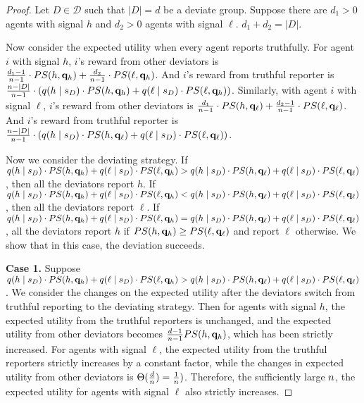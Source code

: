 \begin{proof}
    Let $D\in \mathcal{D}$ such that $|D| = d$ be a deviate group. Suppose there are $d_1 > 0$ agents with signal $h$ and $d_2 > 0$ agents with signal $\ell$. $d_1 + d_2 = |D|$. 

    Now consider the expected utility when every agent reports truthfully. For agent $i$ with signal $h$, $i$'s reward from other deviators is $\frac{d_1 -1}{n -1}\cdot PS(h, \mathbf{q}_h) + \frac{d_2}{n - 1}\cdot PS(\ell, \mathbf{q}_h)$. And $i$'s reward from truthful reporter is $\frac{n - |D|}{n - 1} \cdot (q(h\mid s_D)\cdot PS(h, \mathbf{q}_h) + q(\ell \mid s_D)\cdot PS(\ell, \mathbf{q}_h))$. Similarly, with agent $i$ with signal $\ell$, $i$'s reward from other deviators is $\frac{d_1}{n -1}\cdot PS(h, \mathbf{q}_\ell) + \frac{d_2 - 1}{n - 1}\cdot PS(\ell, \mathbf{q}_\ell)$. And $i$'s reward from truthful reporter is $\frac{n - |D|}{n - 1} \cdot (q(h\mid s_D)\cdot PS(h, \mathbf{q}_\ell) + q(\ell \mid s_D)\cdot PS(\ell, \mathbf{q}_\ell))$.

    Now we consider the deviating strategy. If $q(h\mid s_D)\cdot PS(h, \mathbf{q}_h) + q(\ell \mid s_D)\cdot PS(\ell, \mathbf{q}_h) > q(h\mid s_D)\cdot PS(h, \mathbf{q}_\ell) + q(\ell \mid s_D)\cdot PS(\ell, \mathbf{q}_\ell)$, then all the deviators report $h$. If $q(h\mid s_D)\cdot PS(h, \mathbf{q}_h) + q(\ell \mid s_D)\cdot PS(\ell, \mathbf{q}_h) < q(h\mid s_D)\cdot PS(h, \mathbf{q}_\ell) + q(\ell \mid s_D)\cdot PS(\ell, \mathbf{q}_\ell)$, then all the deviators report $\ell$. If $q(h\mid s_D)\cdot PS(h, \mathbf{q}_h) + q(\ell \mid s_D)\cdot PS(\ell, \mathbf{q}_h) = q(h\mid s_D)\cdot PS(h, \mathbf{q}_\ell) + q(\ell \mid s_D)\cdot PS(\ell, \mathbf{q}_\ell)$, all the deviators report $h$ if $PS(h, \mathbf{q}_h)\ge PS(\ell, \mathbf{q}_\ell)$ and report $\ell$ otherwise. 
    We show that in this case, the deviation succeeds. 

    \noindent\textbf{Case 1.} Suppose $q(h\mid s_D)\cdot PS(h, \mathbf{q}_h) + q(\ell \mid s_D)\cdot PS(\ell, \mathbf{q}_h) > q(h\mid s_D)\cdot PS(h, \mathbf{q}_\ell) + q(\ell \mid s_D)\cdot PS(\ell, \mathbf{q}_\ell)$.
    We consider the changes on the expected utility after the deviators switch from truthful reporting to the deviating strategy. 
    Then for agents with signal $h$, the expected utility from the truthful reporters is unchanged, and the expected utility from other deviators becomes $\frac{d - 1}{n - 1}PS(h, \mathbf{q}_h)$, which has been strictly increased. For agents with signal $\ell$, the expected utility from the truthful reporters strictly increases by a constant factor, while the changes in expected utility from other deviators is $\Theta(\frac{d}{n}) = \frac{1}{n})$. Therefore, the sufficiently large $n$, the expected utility for agents with signal $\ell$ also strictly increases. 


\end{proof}
